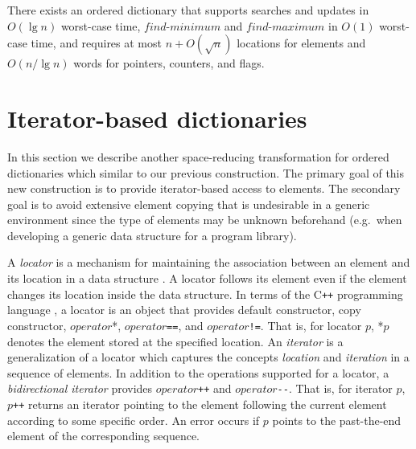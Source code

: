 \documentclass{DIKU-article}
\newcommand{\Findmin}{\mbox{$\mathit{find}$\textnormal{-}}\allowbreak{}\mbox{$\mathit{minimum}$}}
\newcommand{\Findmax}{\mbox{$\mathit{find}$\textnormal{-}}\allowbreak{}\mbox{$\mathit{maximum}$}}
\newcommand{\seclabel}[1]{\label{sec:#1}}
\newcommand{\Operator}{\mbox{$\mathit{operator}$}}
\begin{document}
\begin{corollary}
\label{corollary:red-black}
There exists an ordered dictionary that supports searches and updates
in $O(\lg n)$ worst-case time, \Findmin{} and \Findmax{} in $O(1)$
worst-case time, and requires at most $n + O(\sqrt{n})$ locations for
elements and $O(n/\lg n)$ words for pointers, counters, and flags.
\end{corollary}

\section{Iterator-based dictionaries}\seclabel{iterator-dictionaries}

In this section we describe another space-reducing transformation for
ordered dictionaries which similar to our previous construction. The
primary goal of this new construction is to provide iterator-based access
to elements.  The secondary goal is to avoid extensive element copying
that is undesirable in a generic environment since the type of
elements may be unknown beforehand (e.g.~when developing a generic
data structure for a program library).

A \emph{locator} is a mechanism for maintaining the association
between an element and its location in a data structure \cite[Section
6.4]{GT98}. A locator follows its element even if the element changes
its location inside the data structure. In terms of the C\texttt{++}
programming language \cite{ISO}, a locator is an object that provides
default constructor, copy constructor, \Operator{}*,
\Operator{}\texttt{==}, and \Operator{}\texttt{!=}. That is, for
locator $p$, *$p$ denotes the element stored at the specified
location.  An \emph{iterator} is a generalization of a locator which
captures the concepts \textit{location} and \textit{iteration} in a
sequence of elements. In addition to the operations supported for a
locator, a \emph{bidirectional iterator} provides
\Operator{}\texttt{++} and \Operator{}\texttt{-}\texttt{-}. That is,
for iterator $p$, $p$\texttt{++} returns an iterator pointing to the
element following the current element according to some
specific order. An error occurs if $p$ points to the past-the-end
element of the corresponding sequence.
\end{document}
